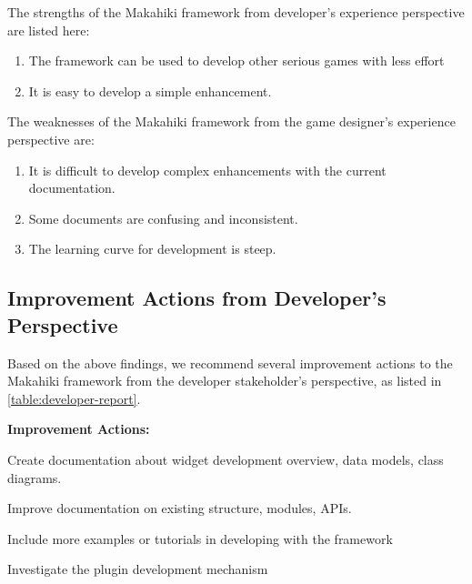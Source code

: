 The strengths of the Makahiki framework from developer's experience perspective are listed here:
    \begin{enumerate}
    \item The framework can be used to develop other serious games with less effort
    \item It is easy to develop a simple enhancement.
    \end{enumerate} 
The weaknesses of the Makahiki framework from the game designer's experience perspective are:
    \begin{enumerate}
    \item It is difficult to develop complex enhancements with the current documentation.
    \item Some documents are confusing and inconsistent.
    \item The learning curve for development is steep. 
    \end{enumerate} 

\subsection{Improvement Actions from Developer's Perspective}

Based on the above findings, we recommend several improvement actions to the Makahiki framework from the developer stakeholder's perspective, as listed in \autoref{table:developer-report}.

\begin{table}[t!]
\begin{shadebox}
{\bf Improvement Actions:}
\begin{compactenum}
\item Create documentation about widget development overview, data models, class diagrams.
\item Improve documentation on existing structure, modules, APIs.
\item Include more examples or tutorials in developing with the framework
\item Investigate the plugin development mechanism
\end{compactenum}
\end{shadebox}
\caption{SGSEAM Improvement Action Report from Developer's Perspective}
\label{table:developer-report}
\end{table}

